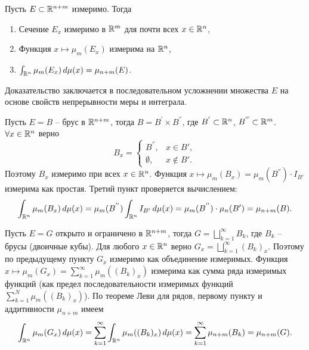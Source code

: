 \begin{theorem}
	Пусть $E \subset \mathbb{R}^{n+m}$ измеримо. Тогда 
	\begin{enumerate}[itemsep = 0pt, topsep = 5pt]
		\item Сечение $E_x$ измеримо в $\mathbb{R}^m$ для почти всех $x \in \mathbb{R}^n$, 
		\item Функция $x \mapsto \mu_m(E_x)$ измерима на $\mathbb{R}^n$, 
		\item $\int_{\mathbb{R}^n} \mu_m(E_x) \, d\mu(x) = \mu_{n+m}(E)$.
	\end{enumerate}
\end{theorem}

\begin{myproof}
	Доказательство заключается в последовательном усложнении множества $E$ на основе свойств непрерывности меры и интеграла.

	\vspace{5pt}
	Пусть $E = B$ -- брус в $\mathbb{R}^{n+m}$, тогда $B = B^{'} \times B^{''}$, где $B^{'} \subset \mathbb{R}^n$, $B^{''} \subset \mathbb{R}^m$. 
	$\forall x \in \mathbb{R}^n$ верно 
	\[ B_x = \begin{cases}
	 B^{''}, & x\in B',  \\  
	 \emptyset, & x\notin B'.  
	\end{cases}\]
	Поэтому $B_x$ измеримо при всех $x \in \mathbb{R}^n$. Функция $x \mapsto \mu_m (B_x) = \mu_m (B^{''}) \cdot I_{B'}$ измерима как простая. 
    Третий пункт проверяется вычислением:
	\[ \int_{\mathbb{R}^n} \mu_m(B_x) \, d\mu(x) = \mu_m(B^{''}) \int_{\mathbb{R}^n} I_{B'} \, d\mu(x) = \mu_m (B^{''}) \cdot \mu_n (B') = \mu_{n+m} (B). \]

	\vspace{5pt}
	Пусть $E = G$ открыто и ограничено в $\mathbb{R}^{n+m}$, тогда $G = \bigsqcup \limits_{k=1}^{\infty} B_k$, где $B_k$ -- брусы (двоичные кубы).
	Для любого $x \in \mathbb{R}^n$ верно $G_x = \bigsqcup \limits_{k=1}^{\infty} (B_k)_x$. Поэтому по предыдущему пункту $G_x$ измеримо как объединение измеримых. 
	Функция $x \mapsto \mu_m(G_x) = \sum \limits_{k=1}^{\infty} \mu_m ((B_k)_x)$ измерима как сумма ряда измеримых функций (как предел последовательности измеримых функций $\sum \limits_{k=1}^{N} \mu_{m} ((B_k)_x)$). 
	По теореме Леви для рядов, первому пункту и аддитивности $\mu_{n+m}$ имеем 
	\[ \int_{\mathbb{R}^n} \mu_m (G_x) \, d\mu(x) = \sum \limits_{k=1}^{\infty} \int_{\mathbb{R}^n} \mu_m((B_k)_x) \, d\mu(x) = \sum \limits_{k=1}^{\infty} \mu_{n+m} (B_k) = \mu_{n+m} (G). \]


\end{myproof}
